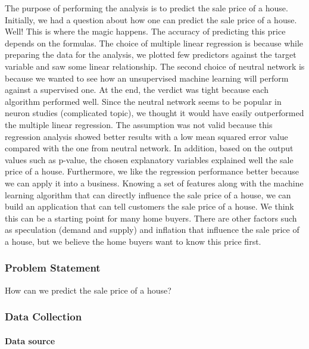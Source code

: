 \documentclass[
]{article}
\begin{document}
The purpose of performing the analysis is to predict the sale price of a
house. Initially, we had a question about how one can predict the sale
price of a house. Well! This is where the magic happens. The accuracy of
predicting this price depends on the formulas. The choice of multiple
linear regression is because while preparing the data for the analysis,
we plotted few predictors against the target variable and saw some
linear relationship. The second choice of neutral network is because we
wanted to see how an unsupervised machine learning will perform against
a supervised one. At the end, the verdict was tight because each
algorithm performed well. Since the neutral network seems to be popular
in neuron studies (complicated topic), we thought it would have easily
outperformed the multiple linear regression. The assumption was not
valid because this regression analysis showed better results with a low
mean squared error value compared with the one from neutral network. In
addition, based on the output values such as p-value, the chosen
explanatory variables explained well the sale price of a house.
Furthermore, we like the regression performance better because we can
apply it into a business. Knowing a set of features along with the
machine learning algorithm that can directly influence the sale price of
a house, we can build an application that can tell customers the sale
price of a house. We think this can be a starting point for many home
buyers. There are other factors such as speculation (demand and supply)
and inflation that influence the sale price of a house, but we believe
the home buyers want to know this price first.

\hypertarget{problem-statement}{%
\subsubsection{Problem Statement}\label{problem-statement}}

How can we predict the sale price of a house?

\hypertarget{data-collection}{%
\subsubsection{Data Collection}\label{data-collection}}

\hypertarget{data-source}{%
\paragraph{Data source}\label{data-source}}
\end{document}
